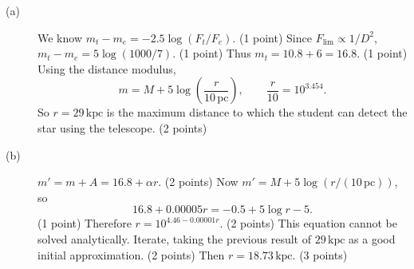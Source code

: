 \begin{description}
\item[(a)] We know $m_t-m_e=-2.5\log(F_t/F_e)$. \hfill(1 point)
Since $F_{\lim}\propto 1/D^2$, $m_t-m_e=5\log(1000/7)$. \hfill(1 point)
Thus $m_t=10.8+6=16.8$. \hfill(1 point)
Using the distance modulus,
\[m=M+5\log\left(\frac{r}{10\,\mathrm{pc}}\right),\qquad\frac r{10}=10^{3.454}.\]
So $r=29\,\mathrm{kpc}$ is the maximum distance to which the student can detect the star using the telescope. \hfill(2 points)
\item[(b)] $m'=m+A=16.8+\alpha r$. \hfill(2 points)
Now $m'=M+5\log(r/(10\,\mathrm{pc}))$, so
\[16.8+0.00005r=-0.5+5\log r-5.\]
\hfill(1 point)
Therefore $r=10^{4.46-0.00001r}$. \hfill(2 points)
This equation cannot be solved analytically. Iterate, taking the previous result of $29\,\mathrm{kpc}$ as a good initial approximation. \hfill(2 points)
Then $r=18.73\,\mathrm{kpc}$. \hfill(3 points)
\end{description}
